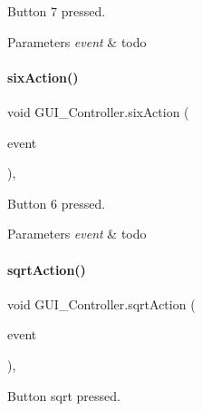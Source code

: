 Button \textquotesingle{}7\textquotesingle{} pressed. 


\begin{DoxyParams}{Parameters}
{\em event} & todo \\
\hline
\end{DoxyParams}
\mbox{\label{classGUI__Controller_a7d45a1041c32ff8ca5e721c56651fe49}} 
\paragraph{\texorpdfstring{six\+Action()}{sixAction()}}
{\footnotesize\ttfamily void G\+U\+I\+\_\+\+Controller.\+six\+Action (\begin{DoxyParamCaption}\item[{Action\+Event}]{event }\end{DoxyParamCaption})\hspace{0.3cm}{\ttfamily [inline]}, {\ttfamily [private]}}



Button \textquotesingle{}6\textquotesingle{} pressed. 


\begin{DoxyParams}{Parameters}
{\em event} & todo \\
\hline
\end{DoxyParams}
\mbox{\label{classGUI__Controller_a504ebbabf072956cac740e9fdc4e68c9}} 
\paragraph{\texorpdfstring{sqrt\+Action()}{sqrtAction()}}
{\footnotesize\ttfamily void G\+U\+I\+\_\+\+Controller.\+sqrt\+Action (\begin{DoxyParamCaption}\item[{Action\+Event}]{event }\end{DoxyParamCaption})\hspace{0.3cm}{\ttfamily [inline]}, {\ttfamily [private]}}



Button \textquotesingle{}sqrt\textquotesingle{} pressed. 


